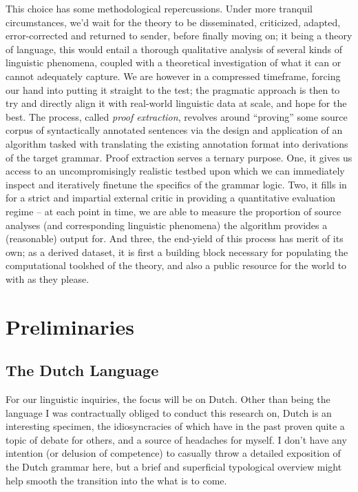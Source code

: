 This choice has some methodological repercussions.
Under more tranquil circumstances, we'd wait for the theory to be disseminated, criticized, adapted, error-corrected and returned to sender, before finally moving on; it being a theory of language, this would entail a thorough qualitative analysis of several kinds of linguistic phenomena, coupled with a theoretical investigation of what it can or cannot adequately capture.
We are however in a compressed timeframe, forcing our hand into putting it straight to the test; the pragmatic approach is then to try and directly align it with real-world linguistic data at scale, and hope for the best.
The process, called \textit{proof extraction}, revolves around ``proving''  some source corpus of syntactically annotated sentences via the design and application of an algorithm tasked with translating the existing annotation format into derivations of the target grammar.
Proof extraction serves a ternary purpose.
One, it gives us access to an uncompromisingly realistic testbed upon which we can immediately inspect and iteratively finetune the specifics of the grammar logic.
Two, it fills in for a strict and impartial external critic in providing a quantitative evaluation regime -- at each point in time, we are able to measure the proportion of source analyses (and corresponding linguistic phenomena) the algorithm provides a (reasonable) output for.
And three, the end-yield of this process has merit of its own; as a derived dataset, it is first a building block necessary for populating the computational toolshed of the theory, and also a public resource for the world to with as they please.

\section{Preliminaries}

\subsection{The Dutch Language}
For our linguistic inquiries, the focus will be on Dutch.
Other than being the language I was contractually obliged to conduct this research on, Dutch is an interesting specimen, the idiosyncracies of which have in the past proven quite a topic of debate for others, and a source of headaches for myself.
I don't have any intention (or delusion of competence) to casually throw a detailed exposition of the Dutch grammar here, but a brief and superficial typological overview might help smooth the transition into the what is to come.

